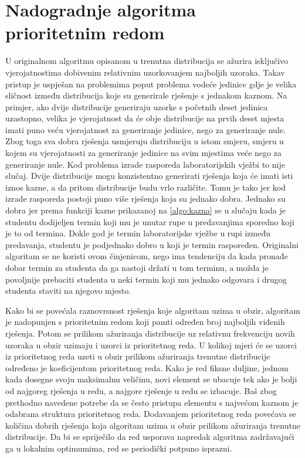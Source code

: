 \documentclass[times, utf8, zavrsni]{fer}
\begin{document}
\section{Nadogradnje algoritma prioritetnim redom}
\label{sec:prioritetni_red}
U originalnom algoritmu opisanom u \cite{DBLP:journals/tec/WuK14} trenutna distribucija se ažurira isključivo vjerojatnostima dobivenim relativnim
uzorkovanjem najboljih uzoraka. Takav pristup je uspješan na problemima poput problema vodeće jedinice gdje je velika sličnost
između distribucija koje su generirale rješenje s jednakom kaznom. Na primjer, ako dvije distribucije generiraju uzorke s početnih
deset jedinica uzastopno, velika je vjerojatnost da će obje distribucije na prvih deset mjesta imati puno veću vjerojatnost
za generiranje jedinice, nego za generiranje nule. Zbog toga sva dobra rješenja usmjeruju distribuciju u istom smjeru,
smjeru u kojem su vjerojatnosti za generiranje jedinice na svim mjestima veće nego za generiranje nule.
Kod problema izrade rasporeda laboratorijskih vježbi to nije slučaj. Dvije
distribucije mogu konzistentno generirati rješenja koja će imati isti iznos kazne, a da pritom distribucije budu vrlo različite.
Tomu je tako jer kod izrade rasporeda postoji puno više rješenja koja su jednako dobra. Jednako su dobra jer prema funkciji
kazne prikazanoj na \ref{algo:kazna} se u slučaju kada je studentu dodijeljen termin koji mu je unutar rupe u predavanjima
sporedno koji je to od termina. Dokle god je termin laboratorijske vježbe u rupi između predavanja, studentu je podjednako dobro
u koji je termin raspoređen. Originalni algoritam se ne koristi ovom činjenicom, nego ima tendenciju da kada pronađe dobar termin
za studenta da ga nastoji držati u tom terminu, a možda je povoljnije prebaciti studenta u neki termin koji mu jednako odgovara
i drugog studenta staviti na njegovo mjesto.

Kako bi se povećala raznovrsnost rješenja koje algoritam uzima u obzir, algoritam je nadopunjen s prioritetnim redom
koji pamti određen broj najboljih viđenih rješenja. Potom se prilikom ažuriranja distribucije uz relativnu frekvenciju novih uzoraka
u obzir uzimaju i uzorci iz prioritetnog reda. U kolikoj mjeri će se uzorci iz prioritetnog reda uzeti u obzir prilikom ažuriranja trenutne distribucije određeno
je koeficijentom prioritetnog reda.
 Kako je red fiksne duljine, jednom kada dosegne svoju maksimalnu veličinu,
novi element se ubacuje tek ako je bolji od najgoreg rješenja u redu, a najgore rješenje u redu se izbacuje. Baš zbog
prethodno navedene potrebe da se često pristupa elementu s najvećom kaznom je odabrana struktura prioritetnog reda. Dodavanjem
prioritetnog reda povećava se količina dobrih rješenja koja algoritam uzima u obzir prilikom ažuriranja trenutne distribucije.
Da bi se spriječilo da red usporava napredak algoritma zadržavajući ga u lokalnim optimumima, red se periodički potpuno isprazni.
\end{document}
